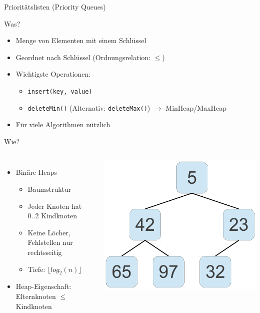 \begin{frame}{Prioritätslisten (Priority Queues)}
	\begin{block}{Was?}
		\begin{itemize}
			\item Menge von Elementen mit einem Schlüssel
			\item Geordnet nach Schlüssel (Ordnungsrelation: $\le$)
			\item Wichtigste Operationen: 
			\begin{itemize}
				\item \texttt{insert(key, value)} 
				\item \texttt{deleteMin()} \tiny{(Alternativ: \texttt{deleteMax()}) $\rightarrow$ MinHeap/MaxHeap}
			\end{itemize}
			\item Für viele Algorithmen nützlich
		\end{itemize}
	\end{block}
	\pause
	\begin{block}{Wie?}
		\begin{columns}
				\vspace{-0.5em}
				\begin{itemize}
					\item Binäre Heaps
					\begin{itemize}
						\item Baumstruktur
						\item Jeder Knoten hat 0..2 Kindknoten
						\item Keine Löcher, Fehlstellen nur rechtsseitig
						\item Tiefe: $\lfloor log_2(n) \rfloor$
					\end{itemize}
					\item Heap-Eigenschaft: Elternknoten $\le$ Kindknoten
				\end{itemize}
				\includegraphics[width=0.95\linewidth]{images/heap.pdf}
		\end{columns}
	\end{block}
\end{frame}

